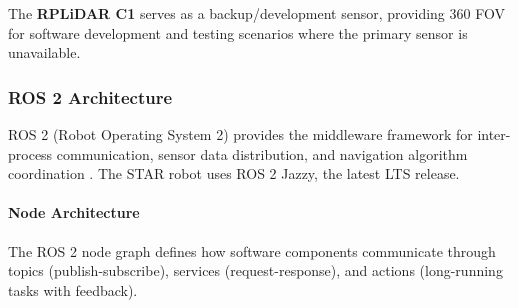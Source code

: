 The \textbf{RPLiDAR C1} serves as a backup/development sensor, providing 360\textdegree{} FOV for software development and testing scenarios where the primary sensor is unavailable.

\subsubsection{ROS 2 Architecture}

ROS 2 (Robot Operating System 2) provides the middleware framework for inter-process communication, sensor data distribution, and navigation algorithm coordination \parencite{ros2_documentation}. The STAR robot uses ROS 2 Jazzy, the latest LTS release.

\paragraph{Node Architecture}

The ROS 2 node graph defines how software components communicate through topics (publish-subscribe), services (request-response), and actions (long-running tasks with feedback).

